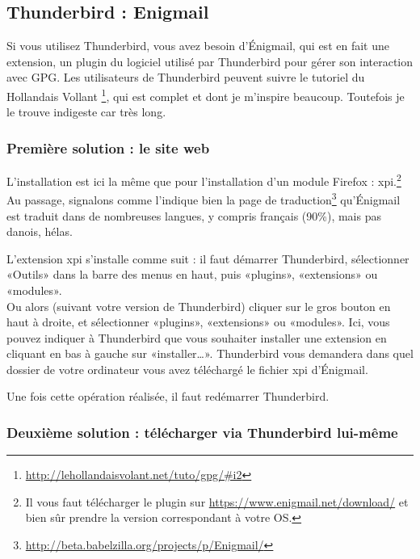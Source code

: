 \subsection{Thunderbird : Enigmail}\label{thunderbird-enigmail}

Si vous utilisez Thunderbird, vous avez besoin d'Énigmail, qui est en
fait une extension, un plugin du logiciel utilisé par Thunderbird pour
gérer son interaction avec GPG. Les utilisateurs de Thunderbird peuvent suivre le tutoriel du Hollandais Vollant
\footnote{\url{http://lehollandaisvolant.net/tuto/gpg/\#i2}}, qui est
complet et dont je m'inspire beaucoup. Toutefois je le trouve indigeste
car très long.

\subsubsection{Première solution : le site web}\label{premiuxe8re-solution-le-site-web}

L'installation est ici la même que pour l'installation d'un module
Firefox : xpi.\footnote{Il vous faut télécharger le plugin sur
\url{https://www.enigmail.net/download/} et bien sûr
prendre la version correspondant à votre OS.} 
Au passage, signalons comme l'indique bien
la page de traduction\footnote{\url{http://beta.babelzilla.org/projects/p/Enigmail/}} qu'Énigmail est traduit dans de nombreuses langues, y
compris français (90\%), mais pas danois, hélas.

L'extension xpi s'installe comme suit : il faut démarrer Thunderbird,
sélectionner «Outils» dans la barre des menus en haut, puis «plugins»,
«extensions» ou «modules».\\Ou alors (suivant votre version de
Thunderbird) cliquer sur le gros bouton en haut à droite, et
sélectionner «plugins», «extensions» ou «modules». Ici, vous pouvez indiquer à Thunderbird que vous souhaiter installer une
extension en cliquant en bas à gauche sur «installer\ldots{}».
Thunderbird vous demandera dans quel dossier de votre ordinateur vous
avez téléchargé le fichier xpi d'Énigmail.

Une fois cette opération réalisée, il faut redémarrer Thunderbird.

\subsubsection{Deuxième solution : télécharger via Thunderbird lui-même}\label{deuxiuxe8me-solution-tuxe9luxe9charger-via-thunderbird-lui-muxeame}

